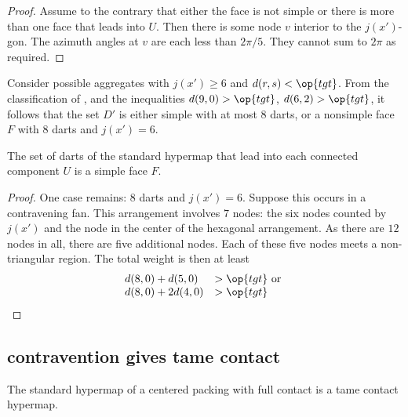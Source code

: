 \begin{proof} Assume to the contrary that either the face is not
  simple or there is more than one face that leads into $U$.  Then
  there is some node $v$ interior to the $j(x')$-gon.  The azimuth
  angles at $v$ are each less than $2\pi/5$. They cannot sum to $2\pi$
  as required.
\end{proof}

Consider possible aggregates with $j(x')\ge 6$ and $d(r,s)<\op{tgt}$.
From the classification of \cite[p.~126,~Fig.~12.1]{Hales:2006:DCG},
and the inequalities $d(9,0) > \op{tgt}$, $d(6,2) > \op{tgt}$, it
follows that the set $D'$ is either simple with at most $8$ darts, or
a nonsimple face $F$ with $8$ darts and $j(x')=6$.

\begin{lemma}\label{lemma:simple} The set of darts of
  the standard hypermap that lead into each connected component $U$ is
  a simple face $F$.
\end{lemma}
%
%

\begin{proof} One case remains: $8$ darts and $j(x')=6$.  Suppose this
  occurs in a contravening fan.  This arrangement involves $7$ nodes:
  the six nodes counted by $j(x')$ and the node in the center of the
  hexagonal arrangement.  As there are $12$ nodes in all, there are
  five additional nodes.  Each of these five nodes meets a
  non-triangular region.  The total weight is then at least
\begin{displaymath}
\begin{array}{lll}
d(8,0) + d(5,0) &> \op{tgt}\hbox{ or }\\
d(8,0) + 2 d(4,0) &> \op{tgt}\\
\end{array}
\end{displaymath}
\end{proof}
%
%








\subsection{contravention gives tame contact}

\begin{theorem} The standard hypermap of a centered
  packing with full contact is a tame contact hypermap.
\end{theorem}
%
%
%
%

